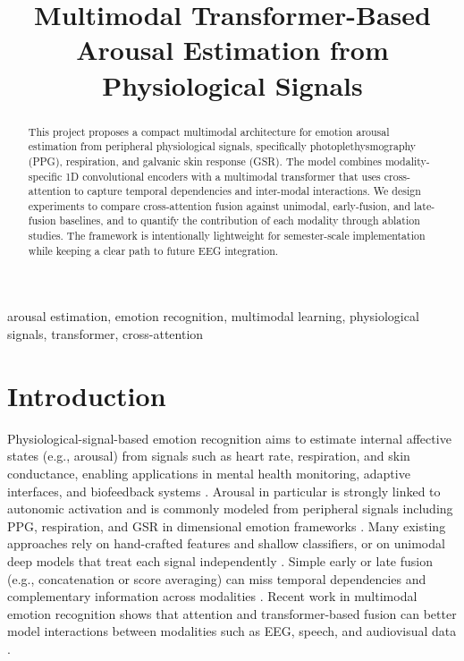 \documentclass[conference]{IEEEtran}
\begin{document}
\title{Multimodal Transformer-Based Arousal Estimation from Physiological Signals}

\author{
}

\maketitle

\begin{abstract}
This project proposes a compact multimodal architecture for emotion arousal estimation from peripheral physiological signals, specifically photoplethysmography (PPG), respiration, and galvanic skin response (GSR). The model combines modality-specific 1D convolutional encoders with a multimodal transformer that uses cross-attention to capture temporal dependencies and inter-modal interactions. We design experiments to compare cross-attention fusion against unimodal, early-fusion, and late-fusion baselines, and to quantify the contribution of each modality through ablation studies. The framework is intentionally lightweight for semester-scale implementation while keeping a clear path to future EEG integration.
\end{abstract}

\begin{IEEEkeywords}
arousal estimation, emotion recognition, multimodal learning, physiological signals, transformer, cross-attention
\end{IEEEkeywords}

\section{Introduction}
Physiological-signal-based emotion recognition aims to estimate internal affective states (e.g., arousal) from signals such as heart rate, respiration, and skin conductance, enabling applications in mental health monitoring, adaptive interfaces, and biofeedback systems \cite{kacimi_comprehensive_2025,wu_comprehensive_2025}. Arousal in particular is strongly linked to autonomic activation and is commonly modeled from peripheral signals including PPG, respiration, and GSR in dimensional emotion frameworks \cite{kacimi_comprehensive_2025,sato_physiological_2020}. Many existing approaches rely on hand-crafted features and shallow classifiers, or on unimodal deep models that treat each signal independently \cite{kacimi_comprehensive_2025,siddiqui_respiration_2021}. Simple early or late fusion (e.g., concatenation or score averaging) can miss temporal dependencies and complementary information across modalities \cite{wu_comprehensive_2025,abdurahmon_general_2025}. Recent work in multimodal emotion recognition shows that attention and transformer-based fusion can better model interactions between modalities such as EEG, speech, and audiovisual data \cite{alam_tmnet_2025,huo_cemtnet_2026,ahire_maven_2025}.
\end{document}
